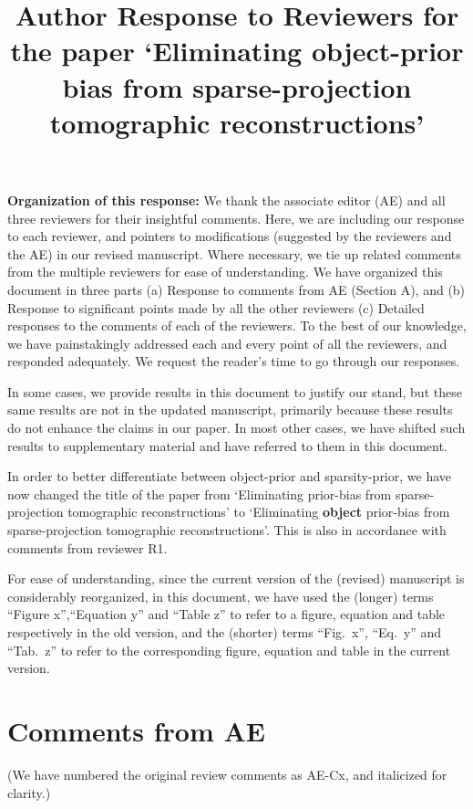 \documentclass{article}
\title{Author Response to Reviewers for the paper `Eliminating object-prior bias from sparse-projection tomographic reconstructions'}
\begin{document}
\maketitle

\textbf{Organization of this response:} We thank the associate editor (AE) and all three reviewers for their insightful comments. Here, we are including our response to each reviewer, and pointers to modifications (suggested by the reviewers and the AE) in our revised manuscript.  Where necessary, we tie up related comments from the multiple reviewers for ease of understanding.  We have organized this document in three parts (a) Response to comments from AE (Section A), and (b) Response to significant points made by all the other reviewers (c) Detailed  responses to the comments of each of the reviewers. To the best of our knowledge, we have painstakingly addressed each and every point of all the reviewers, and responded adequately.  We request the reader's time to go through our responses.

In some cases, we provide results in this document to justify our stand, but these same results are not in the updated manuscript, primarily because these results do not enhance the claims in our paper. In most other cases, we have shifted such results to supplementary material and have referred to them in this document.

In order to better differentiate between object-prior and sparsity-prior, we have now changed the title of the paper from `Eliminating prior-bias from sparse-projection tomographic reconstructions' to `Eliminating \textbf{object} prior-bias from sparse-projection tomographic reconstructions'. This is also in accordance with comments from reviewer R1.

For ease of understanding, since the current version of the (revised) manuscript is considerably reorganized, in this document, we have used the (longer) terms ``Figure x'',``Equation y'' and ``Table z''  to refer to a figure, equation and table respectively in the old version, and the (shorter) terms ``Fig.~x'', ``Eq.~y'' and ``Tab.~z'' to refer to the corresponding figure, equation and table in the current version. 

\section{Comments from AE}

(We have numbered the original review comments as AE-Cx, and italicized for clarity.)\\
\end{document}

